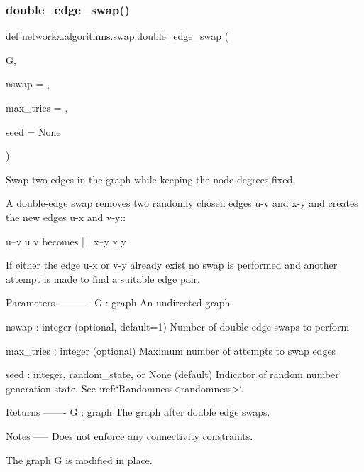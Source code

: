 \subsubsection{\texorpdfstring{double\+\_\+edge\+\_\+swap()}{double\_edge\_swap()}}
{\footnotesize\ttfamily def networkx.\+algorithms.\+swap.\+double\+\_\+edge\+\_\+swap (\begin{DoxyParamCaption}\item[{}]{G,  }\item[{}]{nswap = {},  }\item[{}]{max\+\_\+tries = {},  }\item[{}]{seed = {\ttfamily None} }\end{DoxyParamCaption})}

\begin{DoxyVerb}Swap two edges in the graph while keeping the node degrees fixed.

A double-edge swap removes two randomly chosen edges u-v and x-y
and creates the new edges u-x and v-y::

 u--v            u  v
        becomes  |  |
 x--y            x  y

If either the edge u-x or v-y already exist no swap is performed
and another attempt is made to find a suitable edge pair.

Parameters
----------
G : graph
   An undirected graph

nswap : integer (optional, default=1)
   Number of double-edge swaps to perform

max_tries : integer (optional)
   Maximum number of attempts to swap edges

seed : integer, random_state, or None (default)
    Indicator of random number generation state.
    See :ref:`Randomness<randomness>`.

Returns
-------
G : graph
   The graph after double edge swaps.

Notes
-----
Does not enforce any connectivity constraints.

The graph G is modified in place.
\end{DoxyVerb}
 